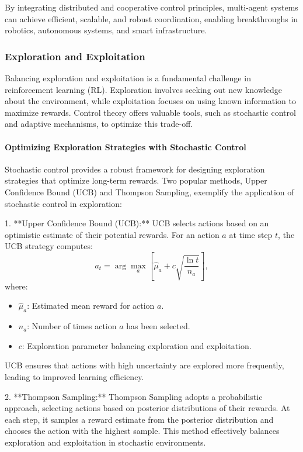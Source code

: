 \documentclass{IEEEojcsys}
\begin{document}
By integrating distributed and cooperative control principles, multi-agent systems can achieve efficient, scalable, and robust coordination, enabling breakthroughs in robotics, autonomous systems, and smart infrastructure.

\subsubsection{Exploration and Exploitation}
Balancing exploration and exploitation is a fundamental challenge in reinforcement learning (RL). Exploration involves seeking out new knowledge about the environment, while exploitation focuses on using known information to maximize rewards. Control theory offers valuable tools, such as stochastic control and adaptive mechanisms, to optimize this trade-off.

\paragraph{Optimizing Exploration Strategies with Stochastic Control}
Stochastic control provides a robust framework for designing exploration strategies that optimize long-term rewards. Two popular methods, Upper Confidence Bound (UCB) and Thompson Sampling, exemplify the application of stochastic control in exploration:

1. **Upper Confidence Bound (UCB):**
   UCB selects actions based on an optimistic estimate of their potential rewards. For an action $a$ at time step $t$, the UCB strategy computes:
   \[
   a_t = \arg\max_a \left[ \hat{\mu}_a + c \sqrt{\frac{\ln t}{n_a}} \right],
   \]
   where:
   \begin{itemize}
       \item $\hat{\mu}_a$: Estimated mean reward for action $a$.
       \item $n_a$: Number of times action $a$ has been selected.
       \item $c$: Exploration parameter balancing exploration and exploitation.
   \end{itemize}
   UCB ensures that actions with high uncertainty are explored more frequently, leading to improved learning efficiency.

2. **Thompson Sampling:**
   Thompson Sampling adopts a probabilistic approach, selecting actions based on posterior distributions of their rewards. At each step, it samples a reward estimate from the posterior distribution and chooses the action with the highest sample. This method effectively balances exploration and exploitation in stochastic environments.
\end{document}
